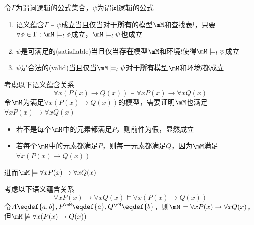 \begin{definition}
令$\Gamma$为谓词逻辑的公式集合，$\psi$为谓词逻辑的公式
\begin{enumerate}
	\item 语义蕴含$\Gamma\models\psi$成立当且仅当对于\textbf{所有}的模型$\mM$和查找表$l$，只要$\forall \phi\in\Gamma:\mM\models_l\phi$成立，$\mM\models_l\psi$也成立
	\item $\psi$是可满足的(satisfiable)当且仅当\textbf{存在}模型$\mM$和环境$l$使得$\mM\models_l\psi$成立
	\item $\psi$是合法的(valid)当且仅当$\mM\models_l\psi$对于\textbf{所有}模型$\mM$和环境$l$都成立
\end{enumerate}
\end{definition}
\begin{example}
考虑以下语义蕴含关系
\[\forall x(P(x)\to Q(x))\models\forall xP(x)\to\forall xQ(x)\]
令$\mM$为满足$\forall x(P(x)\to Q(x))$的模型，需要证明$\mM$也满足$\forall xP(x)\to\forall xQ(x)$
\begin{itemize}
	\item 若不是每个$\mM$中的元素都满足$P$，则前件为假，显然成立
	\item 若每个$\mM$中的元素都满足$P$，则每一元素都满足$Q$，因为$\mM$满足$\forall x(P(x)\to Q(x))$
\end{itemize}
进而$\mM\models\forall xP(x)\to\forall xQ(x)$
\end{example}
\begin{example}
考虑以下语义蕴含关系
\[\forall xP(x)\to\forall xQ(x)\models\forall x(P(x)\to Q(x))\]
令$A\eqdef\{a,b\},P^\mM\eqdef\{a\},Q^\mM\eqdef\{b\}$，则$\mM\models\forall xP(x)\to\forall xQ(x)$，但$\mM\not\models\forall x(P(x)\to Q(x))$
\end{example}

